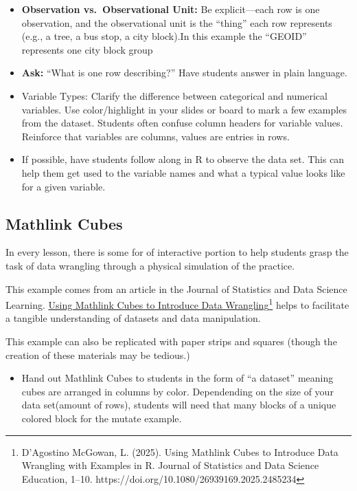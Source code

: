 \documentclass[
  letterpaper,
  DIV=11,
  numbers=noendperiod,
  oneside]{scrartcl}
\providecommand{\tightlist}{%
  \setlength{\itemsep}{0pt}\setlength{\parskip}{0pt}}\usepackage{longtable,booktabs,array}
\begin{document}
\begin{itemize}
\item
  \textbf{Observation vs.~Observational Unit:} Be explicit---each row is
  one observation, and the observational unit is the ``thing'' each row
  represents (e.g., a tree, a bus stop, a city block).In this example
  the ``GEOID'' represents one city block group
\item
  \textbf{Ask:} ``What is one row describing?'' Have students answer in
  plain language.
\item
  Variable Types: Clarify the difference between categorical and
  numerical variables. Use color/highlight in your slides or board to
  mark a few examples from the dataset. Students often confuse column
  headers for variable values. Reinforce that variables are columns,
  values are entries in rows.
\item
  If possible, have students follow along in R to observe the data set.
  This can help them get used to the variable names and what a typical
  value looks like for a given variable.
\end{itemize}

\hypertarget{mathlink-cubes}{%
\subsection{Mathlink Cubes}\label{mathlink-cubes}}

In every lesson, there is some for of interactive portion to help
students grasp the task of data wrangling through a physical simulation
of the practice.

This example comes from an article in the Journal of Statistics and Data
Science Learning.
\href{https://www.tandfonline.com/doi/citedby/10.1080/26939169.2025.2485234?scroll=top\&needAccess=true}{Using
Mathlink Cubes to Introduce Data Wrangling}\footnote{D'Agostino McGowan,
  L. (2025). Using Mathlink Cubes to Introduce Data Wrangling with
  Examples in R. Journal of Statistics and Data Science Education,
  1--10. https://doi.org/10.1080/26939169.2025.2485234} helps to
facilitate a tangible understanding of datasets and data manipulation.

This example can also be replicated with paper strips and squares
(though the creation of these materials may be tedious.)

\begin{itemize}
\tightlist
\item
  Hand out Mathlink Cubes to students in the form of ``a dataset''
  meaning cubes are arranged in columns by color. Dependending on the
  size of your data set(amount of rows), students will need that many
  blocks of a unique colored block for the mutate example.
\end{itemize}
\end{document}
